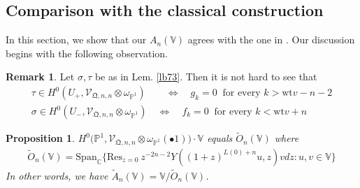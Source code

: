 \documentclass[11pt,b5paper,notitlepage]{article}
\theoremstyle{definition}
\newtheorem{rem}[df]{Remark}
\theoremstyle{plain}
\newtheorem{pp}[df]{Proposition}
\newcommand{\wtd}{\widetilde}
\newcommand{\Res}{\mathrm{Res}}
\newcommand{\Span}{\mathrm{Span}}
\newcommand{\scr}{\mathscr}
\newcommand{\blt}{\bullet}
\newcommand{\Vbb}{\mathbb V}
\newcommand{\Cbb}{\mathbb C}
\newcommand{\Pbb}{\mathbb P}
\newcommand{\wt}{\mathrm{wt}}
\newcommand{\<}{\left\langle}
\renewcommand{\>}{\right\rangle}
\newcommand{\fq}{{\mathfrak Q}}
\numberwithin{equation}{section}
\begin{document}
 








\subsection{Comparison with the classical construction}\label{lb74}




In this section, we show that our $A_n(\Vbb)$ agrees with the one in \cite{DLM-Zhu}. Our discussion begins with the following observation.

\begin{rem}\label{lb75}
Let $\sigma,\tau$ be as in Lem. \ref{lb73}. Then it is not hard to see that
\begin{subequations}
\begin{gather}
\tau\in H^0(U_+,\scr V_{\fq,n,n}\otimes\omega_{\Pbb^1})\quad\quad\Longleftrightarrow\quad g_k=0 ~\text{ for every } k>\wt v-n-2\\
\sigma\in H^0(U_-,\scr V_{\fq,n,n}\otimes\omega_{\Pbb^1})\quad\Longleftrightarrow\quad f_k=0~\text{ for every } k<\wt v+n
\end{gather}
\end{subequations}
\end{rem}

\begin{pp}
$H^0\big(\Pbb^1,\scr V_{\fq,n,n}\otimes\omega_{\Pbb^1}(\blt 1)\big)\cdot\Vbb$ equals $\wtd O_n(\Vbb)$ where
\begin{align}
\wtd O_n(\Vbb)=\Span_\Cbb\big\{\Res_{z=0}~z^{-2n-2}Y((1+z)^{L(0)+n}u,z)vdz:u,v\in\Vbb  \big\}
\end{align}
In other words, we have $\wtd A_n(\Vbb)=\Vbb/\wtd O_n(\Vbb)$.
\end{pp}
\end{document}
